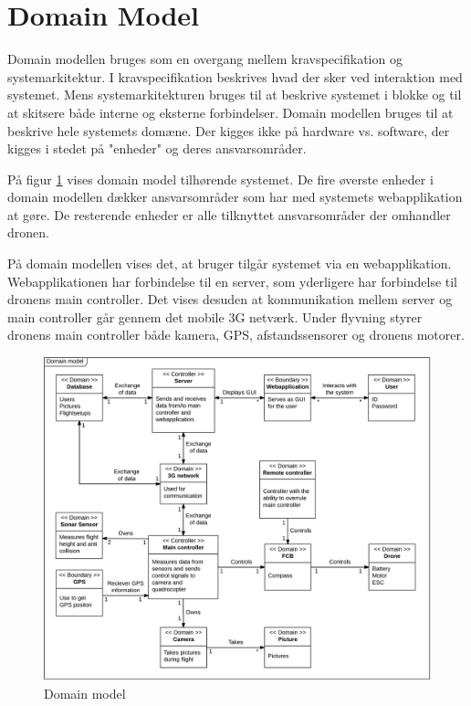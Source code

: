 \section{Domain Model}

Domain modellen bruges som en overgang mellem kravspecifikation og systemarkitektur. 
I kravspecifikation beskrives hvad der sker ved interaktion med systemet. Mens systemarkitekturen bruges til at beskrive systemet i blokke og til at skitsere både interne og eksterne forbindelser. Domain modellen bruges til at beskrive hele systemets domæne. Der kigges ikke på hardware vs. software, der kigges i stedet på "enheder" og deres ansvarsområder.

På figur \ref{fig:domain_model} vises domain model tilhørende systemet. De fire øverste enheder i domain modellen dækker ansvarsområder som har med systemets webapplikation at gøre. De resterende enheder er alle tilknyttet ansvarsområder der omhandler dronen.

På domain modellen vises det, at bruger tilgår systemet via en webapplikation. Webapplikationen har forbindelse til en server, som yderligere har forbindelse til dronens main controller. Det vises desuden at kommunikation mellem server og main controller går gennem det mobile 3G netværk. Under flyvning styrer dronens main controller både kamera, GPS, afstandssensorer og dronens motorer. 


\begin{figure}[H]
	\centering
	\includegraphics[width=1.\textwidth]{Billeder/domain_model.png}
	\caption{Domain model}
	\label{fig:domain_model}
\end{figure}

